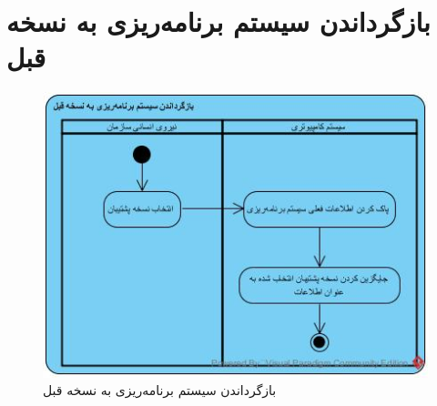 \section{بازگرداندن سیستم برنامه‌ریزی به نسخه قبل  }
\begin{figure}[H]
	\centering
	\includegraphics[scale=0.8]{img/activity/Restore}
	\caption{بازگرداندن سیستم برنامه‌ریزی به نسخه قبل}
\end{figure}
